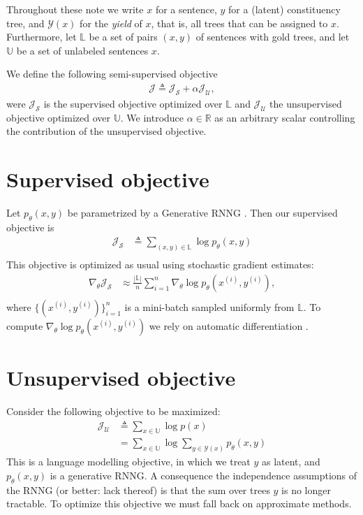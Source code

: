 % 

Throughout these note we write $x$ for a sentence, $y$ for a (latent) constituency tree, and $\mathcal{Y}(x)$ for the \textit{yield} of $x$, that is, all trees that can be assigned to $x$. Furthermore, let $\mathbb{L}$ be a set of pairs $(x, y)$ of sentences with gold trees, and let $\mathbb{U}$ be a set of unlabeled sentences $x$.

We define the following semi-supervised objective
\begin{align*}
    \mathcal{J} \triangleq \mathcal{J}_{\mathcal{S}} + \alpha \mathcal{J}_{\mathcal{U}},
\end{align*}
were $\mathcal{J}_{\mathcal{S}}$ is the supervised objective optimized over $\mathbb{L}$ and $\mathcal{J}_{\mathcal{U}}$ the unsupervised objective optimized over $\mathbb{U}$. We introduce $\alpha \in \mathbb{R}$ as an arbitrary scalar controlling the contribution of the unsupervised objective.

\section{Supervised objective}
Let $p_{\theta}(x,y)$ be parametrized by a Generative RNNG \citep{Dyer+2016:RNNG}. Then our supervised objective is
\begin{align*}
    \mathcal{J}_{\mathcal{S}}
        &\triangleq \sum_{(x,y) \in \mathbb{L}} \log p_{\theta} (x, y) \\
\end{align*}
This objective is optimized as usual using stochastic gradient estimates:
\begin{align*}
    \nabla_{\theta} \mathcal{J}_{\mathcal{S}}
        &\approx \frac{|\mathbb{L}|}{n} \sum_{i=1}^n \nabla_{\theta} \log p_{\theta} (x^{(i)}, y^{(i)}), \\
\end{align*}
where $\{(x^{(i)}, y^{(i)})\}_{i=1}^n$ is a mini-batch sampled uniformly from $\mathbb{L}$. To compute $\nabla_{\theta} \log p_{\theta}(x^{(i)}, y^{(i)})$ we rely on automatic differentiation \citep{Baydin+2017:AD}.

\section{Unsupervised objective}
Consider the following objective to be maximized:
\begin{subequations}
\begin{align*}
    \mathcal{J}_{\mathcal{U}}
        &\triangleq \sum_{x \in \mathbb{U}} \log p (x) \\
        &= \sum_{x \in \mathbb{U}} \log \sum_{y \in \mathcal{Y}(x)} p_{\theta}(x, y)
\end{align*}
\end{subequations}
This is a language modelling objective, in which we treat $y$ as latent, and $p_{\theta}(x,y)$ is a generative RNNG. A consequence the independence assumptions of the RNNG (or better: lack thereof) is that the sum over trees $y$ is no longer tractable.  To optimize this objective we must fall back on approximate methods.

